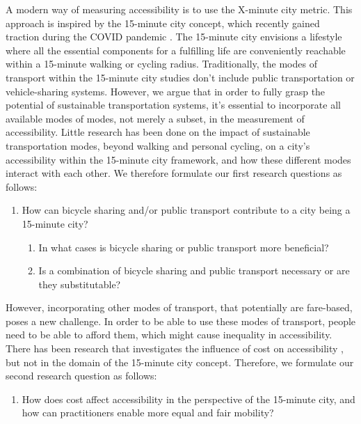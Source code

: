 A modern way of measuring accessibility is to use the X-minute city metric.
This approach is inspired by the 15-minute city concept, which recently gained traction during the COVID pandemic .
The 15-minute city envisions a lifestyle where all the essential components for a fulfilling life are conveniently reachable within a 15-minute walking or cycling radius.
Traditionally, the modes of transport within the 15-minute city studies don't include public transportation or vehicle-sharing systems.
However, we argue that in order to fully grasp the potential of sustainable transportation systems, it's essential to incorporate all available modes of modes, not merely a subset, in the measurement of accessibility.
Little research has been done on the impact of sustainable transportation modes, beyond walking and personal cycling, on a city's accessibility within the 15-minute city framework, and how these different modes interact with each other.
We therefore formulate our first research questions as follows:

\begin{enumerate}
  \renewcommand{\labelenumi}{RQ \theenumi.}
  \item How can bicycle sharing and/or public transport contribute to a city being a 15-minute city?
  \label{rq:bicycle_pt}
  \begin{enumerate}
    \item In what cases is bicycle sharing or public transport more beneficial?
    \item Is a combination of bicycle sharing and public transport necessary or are they substitutable?
  \end{enumerate}
\end{enumerate}

However, incorporating other modes of transport, that potentially are fare-based, poses a new challenge.
In order to be able to use these modes of transport, people need to be able to afford them, which might cause inequality in accessibility.
There has been research that investigates the influence of cost on accessibility , but not in the domain of the 15-minute city concept.
Therefore, we formulate our second research question as follows:

\begin{enumerate}
  \renewcommand{\labelenumi}{RQ \theenumi.}
  \setcounter{enumi}{1}
  \item How does cost affect accessibility in the perspective of the 15-minute city, and how can practitioners enable more equal and fair mobility?
  \label{rq:cost_accessibility}
\end{enumerate}

